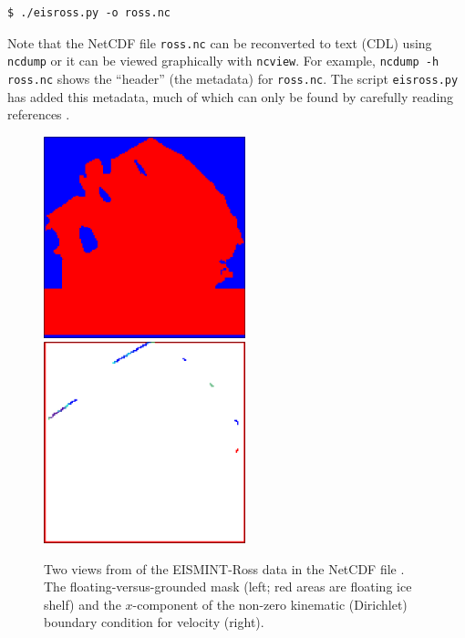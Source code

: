 \documentclass[11pt,final]{amsart}
\begin{document}
\begin{verbatim}
$ ./eisross.py -o ross.nc
\end{verbatim}
Note that the NetCDF file \verb|ross.nc| can be reconverted to text (CDL) using \verb|ncdump| or it can be viewed graphically with \verb|ncview|.  For example, \verb|ncdump -h ross.nc| shows the ``header'' (the metadata) for \verb|ross.nc|.  The script \verb|eisross.py| has added this metadata, much of which can only be found by carefully reading references \cite{RIGGS2,RIGGS1,MacAyealetal}.

\begin{figure}[ht]
\includegraphics[height=2.3in,keepaspectratio=true]{rossmask} \qquad \includegraphics[height=2.3in,keepaspectratio=true]{rossubar}
\caption{Two views from  of the EISMINT-Ross data in the NetCDF file .  The floating-versus-grounded mask (left; red areas are floating ice shelf) and the $x$-component of the non-zero kinematic (Dirichlet) boundary condition for velocity (right).}
\label{fig:rossmaskubar}
\end{figure}
\end{document}
